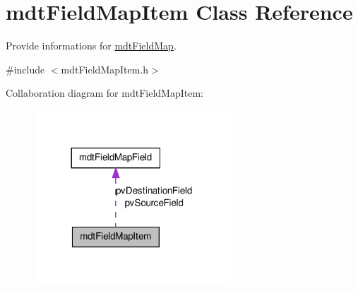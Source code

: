 \hypertarget{classmdt_field_map_item}{
\section{mdtFieldMapItem Class Reference}
\label{classmdt_field_map_item}
}


Provide informations for \hyperlink{classmdt_field_map}{mdtFieldMap}.  




{\ttfamily \#include $<$mdtFieldMapItem.h$>$}



Collaboration diagram for mdtFieldMapItem:
\nopagebreak
\begin{figure}[H]
\begin{center}
\leavevmode
\includegraphics[width=209pt]{classmdt_field_map_item__coll__graph}
\end{center}
\end{figure}
